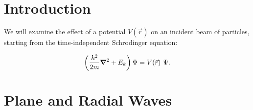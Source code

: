 \documentclass[12pt]{article}
\begin{document}
\newcommand{\pt}           {\ensuremath{ p_{\rm T} }}
\newcommand{\Et}           {\ensuremath{ E_{\rm t}     }}

\let\divsymb=\div %
\newcommand{\gv}[1]{\ensuremath{\mbox{\boldmath$ #1 $}}} 
\newcommand{\grad}[1]{\gv{\nabla} #1} %
\renewcommand{\div}[1]{\gv{\nabla} \cdot #1} %


\newcommand{\abs}[1]{\left| #1 \right|} %
\newcommand{\avg}[1]{\left< #1 \right>} %




\let\underdot=\d %
\renewcommand{\d}[2]{\frac{d #1}{d #2}} %
\newcommand{\dd}[2]{\frac{d^2 #1}{d #2^2}} %
\newcommand{\pd}[2]{\frac{\partial #1}{\partial #2}} %
\newcommand{\pdd}[2]{\frac{\partial^2 #1}{\partial #2^2}} %
\newcommand{\pdc}[3]{\left( \frac{\partial #1}{\partial #2} \right)_{#3}} %

\newcommand{\planewave}{e^{\textstyle i\vec{k} \cdot \vec{x}}}
\newcommand{\radialwave}{\frac{1}{r} \, e^{\textstyle ikr}} 

\section{Introduction}

We will examine the effect of a potential $V(\vec{r})$ on an incident beam of
particles, starting from the time-independent Schrodinger equation:

\begin{equation} \label{eqn:tise}
\left( \frac{\hbar^2}{2m} \grad^2 + E_k \right) \Psi = V(\vec{r})~\Psi.
\end{equation}

\section{Plane and Radial Waves}
\end{document}
